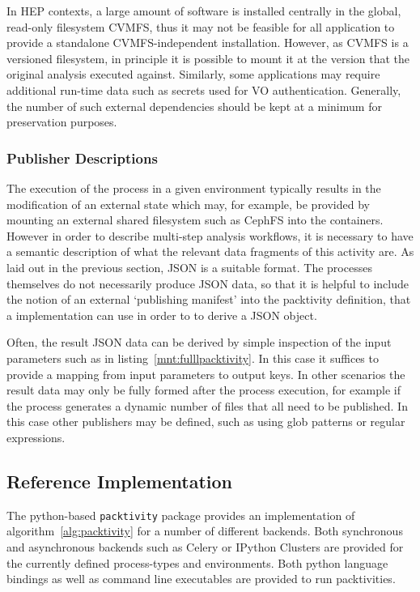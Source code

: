 \documentclass[a4paper]{jpconf}
\begin{document}
In HEP contexts, a large amount of software is installed centrally in the global, read-only filesystem CVMFS, thus it may not be feasible for all application to provide a standalone CVMFS-independent installation. However, as CVMFS is a versioned filesystem, in principle it is possible to mount it at the version that the original analysis executed against. Similarly, some applications may require additional run-time data such as secrets used for VO authentication. Generally, the number of such external dependencies should be kept at a minimum for preservation purposes.

\subsubsection{Publisher Descriptions}
The execution of the process in a given environment typically results in the modification of an external state which may, for example, be provided by mounting an external shared filesystem such as CephFS into the containers. However in order to describe multi-step analysis workflows, it is necessary to have a semantic description of what the relevant data fragments of this activity are. As laid out in the previous section, JSON is a suitable format. The processes themselves do not necessarily produce JSON data, so that it is helpful to include the notion of an external `publishing manifest' into the packtivity definition, that a implementation can use in order to to derive a JSON object. 

Often, the result JSON data can be derived by simple inspection of the input parameters such as in listing~\ref{mnt:fulllpacktivity}. In this case it suffices to provide a mapping from input parameters to output keys. In other scenarios the result data may only be fully formed after the process execution, for example if the process generates a dynamic number of files that all need to be published. In this case other publishers may be defined, such as using glob patterns or regular expressions.

\subsection{Reference Implementation}

The python-based \verb+packtivity+\cite{packtivity} package provides an implementation of algorithm~\ref{alg:packtivity} for a number of different backends. Both synchronous and asynchronous backends such as Celery or IPython Clusters are provided for the currently defined process-types and environments. Both python language bindings as well as command line executables are provided to run packtivities.
\end{document}
